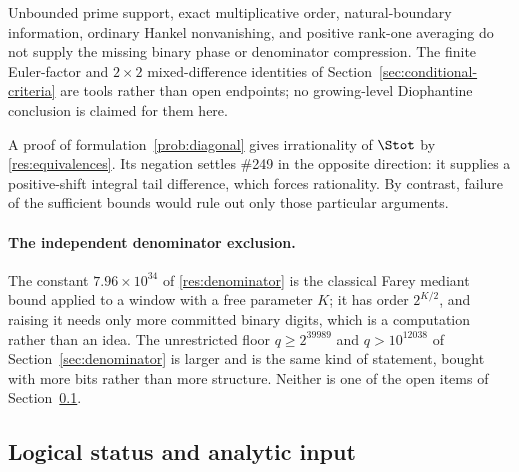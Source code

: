 \begin{remark}
Unbounded prime support, exact multiplicative order, natural-boundary
information, ordinary Hankel nonvanishing, and positive rank-one averaging do
not supply the missing binary phase or denominator compression.  The finite
Euler-factor and $2\times2$ mixed-difference identities of
Section~\ref{sec:conditional-criteria} are tools rather than open endpoints; no
growing-level Diophantine conclusion is claimed for them here.
\end{remark}

A proof of formulation~\ref{prob:diagonal} gives irrationality of $\Stot$ by
\ref{res:equivalences}.  Its negation settles \#249 in the opposite direction:
it supplies a positive-shift integral tail difference, which forces
rationality.  By contrast, failure of the sufficient bounds would rule out
only those particular arguments.

\paragraph{The independent denominator exclusion.}
The constant $7.96\times10^{34}$ of \ref{res:denominator} is the classical
Farey mediant bound applied to a window with a free parameter $K$; it has
order $2^{K/2}$, and raising it needs only more committed binary digits, which
is a computation rather than an idea.  The unrestricted floor
$q\ge2^{39989}$ and $q>10^{12038}$ of Section~\ref{sec:denominator} is larger and is
the same kind of statement, bought with more bits rather than more structure.
Neither is one of the open items of Section~\ref{sec:open}.

\subsection{Logical status and analytic input}\label{sec:open}

